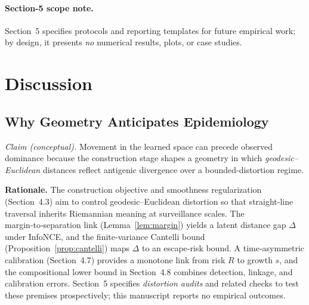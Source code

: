 \documentclass[11pt]{article}
\begin{document}
\paragraph{Section-5 scope note.}
Section~5 specifies protocols and reporting templates for future empirical work; by design, it presents \emph{no} numerical results, plots, or case studies.

\section{Discussion}

\subsection{Why Geometry Anticipates Epidemiology}
\label{sec:why-geometry}
\emph{Claim (conceptual).} Movement in the learned space can precede observed dominance because the construction stage shapes a geometry in which \emph{geodesic--Euclidean} distances reflect antigenic divergence over a bounded-distortion regime.

\noindent\textbf{Rationale.} The construction objective and smoothness regularization (Section~4.3) aim to control geodesic--Euclidean distortion so that straight-line traversal inherits Riemannian meaning at surveillance scales. The margin‑to‑separation link (Lemma~\ref{lem:margin}) yields a latent distance gap $\Delta$ under InfoNCE, and the finite‑variance Cantelli bound (Proposition~\ref{prop:cantelli}) maps $\Delta$ to an escape‑risk bound. A time‑asymmetric calibration (Section~4.7) provides a monotone link from risk $R$ to growth $s$, and the compositional lower bound in Section~4.8 combines detection, linkage, and calibration errors. Section~5 specifies \emph{distortion audits} and related checks to test these premises prospectively; this manuscript reports no empirical outcomes.
\end{document}
